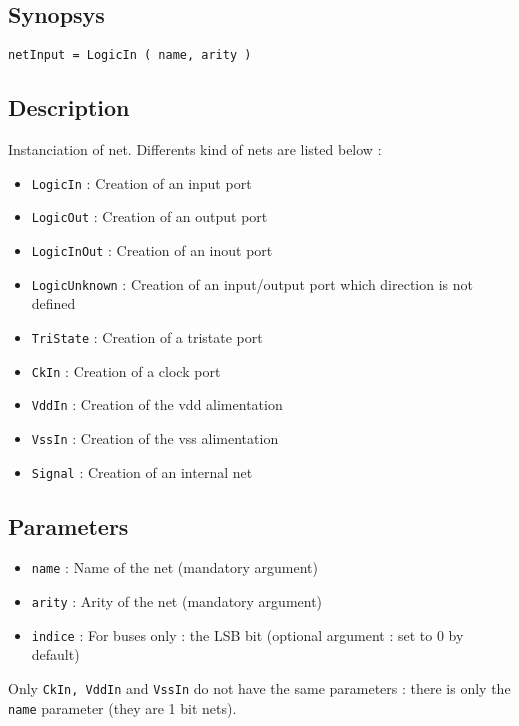 \subsection{Synopsys}

\begin{verbatim}
netInput = LogicIn ( name, arity )
\end{verbatim}

\subsection{Description}

Instanciation of net. Differents kind of nets are listed below :
\begin{itemize}
    \item \verb-LogicIn- : Creation of an input port
    \item \verb-LogicOut- : Creation of an output port
    \item \verb-LogicInOut- : Creation of an inout port
    \item \verb-LogicUnknown- : Creation of an input/output port which direction is not defined
    \item \verb-TriState- : Creation of a tristate port
    \item \verb-CkIn- : Creation of a clock port
    \item \verb-VddIn- : Creation of the vdd alimentation
    \item \verb-VssIn- : Creation of the vss alimentation
    \item \verb-Signal- : Creation of an internal net
\end{itemize}
        
\subsection{Parameters}

\begin{itemize}
    \item \verb-name- : Name of the net (mandatory argument)
    \item \verb-arity- : Arity of the net (mandatory argument)
    \item \verb-indice- : For buses only : the LSB bit (optional argument : set to 0 by default)\\
\end{itemize}

\indent Only \verb-CkIn, -\verb-VddIn- and \verb-VssIn- do not have the same parameters : there is only the \verb-name- parameter (they are 1 bit nets).


